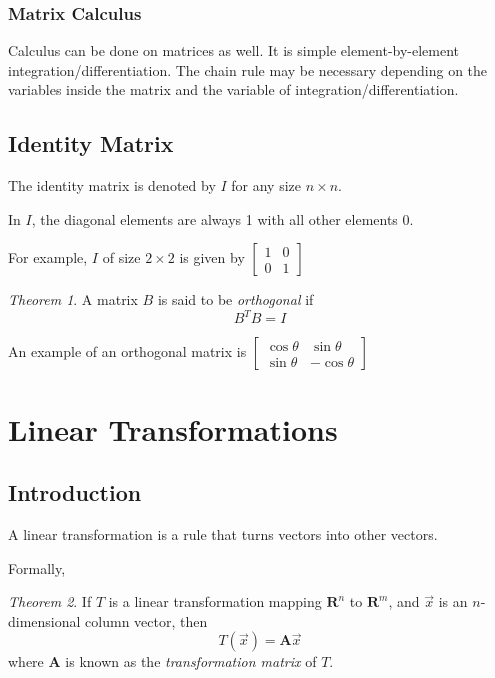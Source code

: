 \documentclass[a4paper]{article}
\theoremstyle{remark}
\theoremstyle{theorem}
\newtheorem{theorem}{Theorem}
\begin{document}
\subsubsection{Matrix Calculus}
Calculus can be done on matrices as well.
It is simple element-by-element integration/differentiation.
The chain rule may be necessary depending on the variables inside the matrix and the variable of integration/differentiation.

\subsection{Identity Matrix}
The identity matrix is denoted by $I$ for any size $n\times n$.

In $I$, the diagonal elements are always 1 with all other elements 0.

For example, $I$ of size $2\times 2$ is given by
$\begin{bmatrix}
	1	& 0 \\
	0	& 1
\end{bmatrix}$

\begin{theorem}
	A matrix $B$ is said to be \emph{orthogonal} if
	\begin{equation}
	B^TB = I
	\end{equation}
\end{theorem}

An example of an orthogonal matrix is $\begin{bmatrix} \cos{\theta} & \sin{\theta} \\ \sin{\theta} & -\cos{\theta}\end{bmatrix}$

\section{Linear Transformations}
\subsection{Introduction}
A linear transformation is a rule that turns vectors into other vectors.

Formally,
\begin{theorem}
	If $T$ is a linear transformation mapping $\mathbf{R}^n$ to $\mathbf{R}^m$, and $\vec{x}$ is an $n$-dimensional column vector, then
	\begin{equation}
	T(\vec{x}) = \mathbf{A}\vec{x}
	\end{equation}
	where $\mathbf{A}$ is known as the \emph{transformation matrix} of $T$.
\end{theorem}
\end{document}
